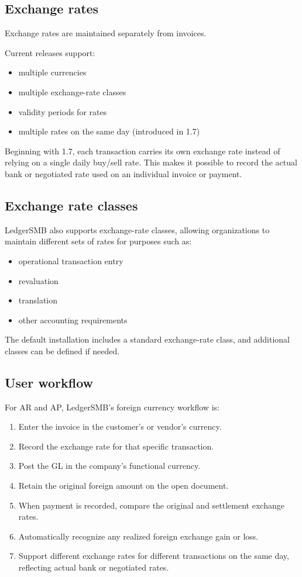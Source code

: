 \subsection{Exchange rates}

Exchange rates are maintained separately from invoices.

Current releases support:

\begin{itemize}
\item multiple currencies
\item multiple exchange-rate classes
\item validity periods for rates
\item multiple rates on the same day (introduced in 1.7)
\end{itemize}

Beginning with 1.7, each transaction carries its own exchange rate instead of relying on a single daily buy/sell rate. This makes it possible to record the actual bank or negotiated rate used on an individual invoice or payment.

\subsection{Exchange rate classes}

LedgerSMB also supports exchange-rate classes, allowing organizations to maintain different sets of rates for purposes such as:
\begin{itemize}
\item operational transaction entry
\item revaluation
\item translation
\item other accounting requirements
\end{itemize}

The default installation includes a standard exchange-rate class, and additional classes can be defined if needed.

\subsection{User workflow}

For AR and AP, LedgerSMB's foreign currency workflow is:
\begin{enumerate}
\item Enter the invoice in the customer's or vendor's currency.
\item Record the exchange rate for that specific transaction.
\item Post the GL in the company's functional currency.
\item Retain the original foreign amount on the open document.
\item When payment is recorded, compare the original and settlement exchange rates.
\item Automatically recognize any realized foreign exchange gain or loss.
\item Support different exchange rates for different transactions on the same day, reflecting actual bank or negotiated rates.
\end{enumerate}

